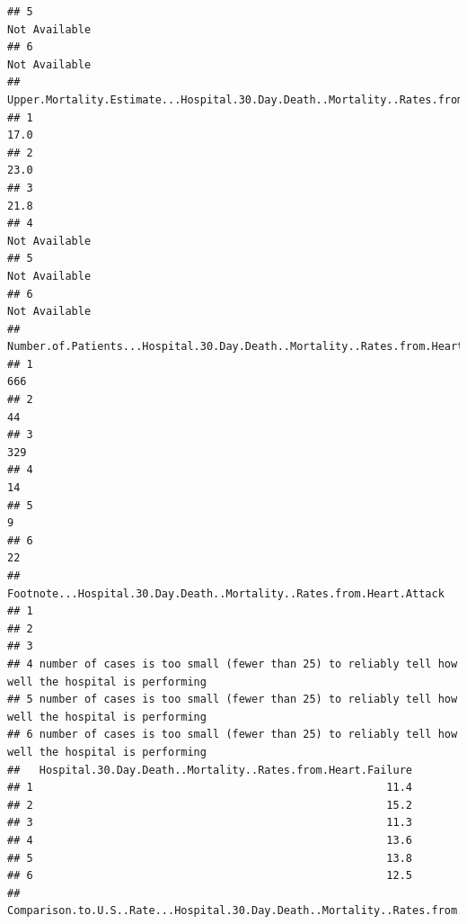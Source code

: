 \documentclass[
]{article}
\begin{document}
\begin{verbatim}
## 5                                                                        Not Available
## 6                                                                        Not Available
##   Upper.Mortality.Estimate...Hospital.30.Day.Death..Mortality..Rates.from.Heart.Attack
## 1                                                                                 17.0
## 2                                                                                 23.0
## 3                                                                                 21.8
## 4                                                                        Not Available
## 5                                                                        Not Available
## 6                                                                        Not Available
##   Number.of.Patients...Hospital.30.Day.Death..Mortality..Rates.from.Heart.Attack
## 1                                                                            666
## 2                                                                             44
## 3                                                                            329
## 4                                                                             14
## 5                                                                              9
## 6                                                                             22
##                                Footnote...Hospital.30.Day.Death..Mortality..Rates.from.Heart.Attack
## 1                                                                                                  
## 2                                                                                                  
## 3                                                                                                  
## 4 number of cases is too small (fewer than 25) to reliably tell how well the hospital is performing
## 5 number of cases is too small (fewer than 25) to reliably tell how well the hospital is performing
## 6 number of cases is too small (fewer than 25) to reliably tell how well the hospital is performing
##   Hospital.30.Day.Death..Mortality..Rates.from.Heart.Failure
## 1                                                       11.4
## 2                                                       15.2
## 3                                                       11.3
## 4                                                       13.6
## 5                                                       13.8
## 6                                                       12.5
##   Comparison.to.U.S..Rate...Hospital.30.Day.Death..Mortality..Rates.from.Heart.Failure

\end{verbatim}
\end{document}
